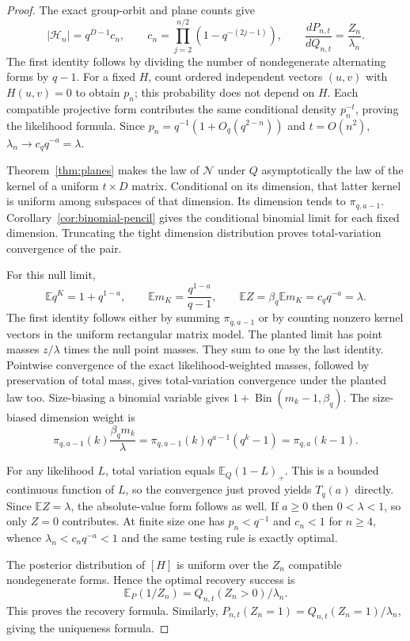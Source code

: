 \begin{proof}
The exact group-orbit and plane counts give
\[
 |\mathcal H_n|=q^{D-1}c_n,\qquad
 c_n=\prod_{j=2}^{n/2}(1-q^{-(2j-1)}),\qquad
 \frac{dP_{n,t}}{dQ_{n,t}}=\frac{Z_n}{\lambda_n}.
\]
The first identity follows by dividing the number of nondegenerate
alternating forms by $q-1$. For a fixed $H$, count ordered independent
vectors $(u,v)$ with $H(u,v)=0$ to obtain $p_n$; this probability does not
depend on $H$. Each compatible projective form contributes the same
conditional density $p_n^{-t}$, proving the likelihood formula.
Since $p_n=q^{-1}(1+O_q(q^{2-n}))$ and $t=O(n^2)$,
$\lambda_n\to c_qq^{-a}=\lambda$.

Theorem~\ref{thm:planes} makes the law of $\mathcal N$ under $Q$
asymptotically the law of the kernel of a uniform $t\times D$ matrix.
Conditional on its dimension, that latter kernel is uniform among
subspaces of that dimension. Its dimension tends to $\pi_{q,a-1}$.
Corollary~\ref{cor:binomial-pencil} gives the conditional binomial limit
for each fixed dimension. Truncating the tight dimension distribution
proves total-variation convergence of the pair.

For this null limit,
\[
 \mathbb E q^K=1+q^{1-a},\qquad
 \mathbb E m_K=\frac{q^{1-a}}{q-1},\qquad
 \mathbb EZ=\beta_q\mathbb E m_K=c_qq^{-a}=\lambda.
\]
The first identity follows either by summing $\pi_{q,a-1}$ or by counting
nonzero kernel vectors in the uniform rectangular matrix model.
The planted limit has point masses $z/\lambda$ times the null point
masses. They sum to one by the last identity. Pointwise convergence of
the exact likelihood-weighted masses, followed by preservation of total
mass, gives total-variation convergence under the planted law too.
Size-biasing a binomial variable gives $1+\operatorname{Bin}(m_k-1,\beta_q)$.
The size-biased dimension weight is
\[
 \pi_{q,a-1}(k)\frac{\beta_qm_k}{\lambda}
 =\pi_{q,a-1}(k)q^{a-1}(q^k-1)=\pi_{q,a}(k-1).
\]

For any likelihood $L$, total variation equals
$\mathbb E_Q(1-L)_+$. This is a bounded continuous function of $L$, so
the convergence just proved yields $T_q(a)$ directly. Since
$\mathbb EZ=\lambda$, the absolute-value form follows as well. If $a\ge0$
then $0<\lambda<1$, so only $Z=0$ contributes. At finite size one has
$p_n<q^{-1}$ and $c_n<1$ for $n\ge4$, whence
$\lambda_n<c_nq^{-a}<1$ and the same testing rule is exactly optimal.

The posterior distribution of $[H]$ is uniform over the $Z_n$ compatible
nondegenerate forms. Hence the optimal recovery success is
\[
 \mathbb E_P(1/Z_n)
 =Q_{n,t}(Z_n>0)/\lambda_n.
\]
This proves the recovery formula. Similarly,
$P_{n,t}(Z_n=1)=Q_{n,t}(Z_n=1)/\lambda_n$, giving the uniqueness formula.
\end{proof}

